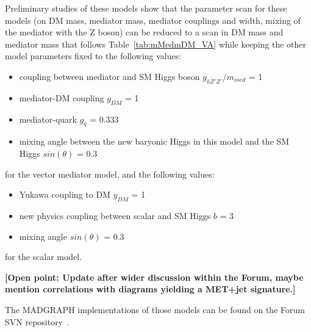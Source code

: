 \documentclass[a4,debug,notitlepage,nobib]{tufte-handout}
\begin{document}
Preliminary studies of these models show that the parameter scan for 
these models (on DM mass, mediator mass, mediator couplings and
width, mixing of the mediator with the Z boson) can be reduced to 
a scan in DM mass and mediator mass that follows Table~\ref{tab:mMedmDM_VA} while keeping 
the other model parameters fixed to the following values: 
\begin{itemize}
 \item coupling between mediator and SM Higgs boson $g_{hZ'Z'}/m_{med}$ = 1
 \item mediator-DM coupling $g_{DM}$ = 1
 \item mediator-quark $g_{q}$ = 0.333
 \item mixing angle between the new baryonic Higgs in this model and the SM Higgs $sin(\theta)$ = 0.3
\end{itemize}
for the vector mediator model, and the following values: 
\begin{itemize}
 \item Yukawa coupling to DM $y_{DM}$ = 1
 \item new physics coupling between scalar and SM Higgs $b$ = 3
 \item mixing angle $sin(\theta)$ = 0.3
\end{itemize}
for the scalar model. 

\textbf{[Open point: Update after wider discussion within the Forum, 
maybe mention correlations with diagrams yielding a MET+jet signature.]}

The MADGRAPH implementations of those models can be found on the Forum SVN 
repository~\cite{ForumSVN_EWMonoHiggs}.


\end{document}
